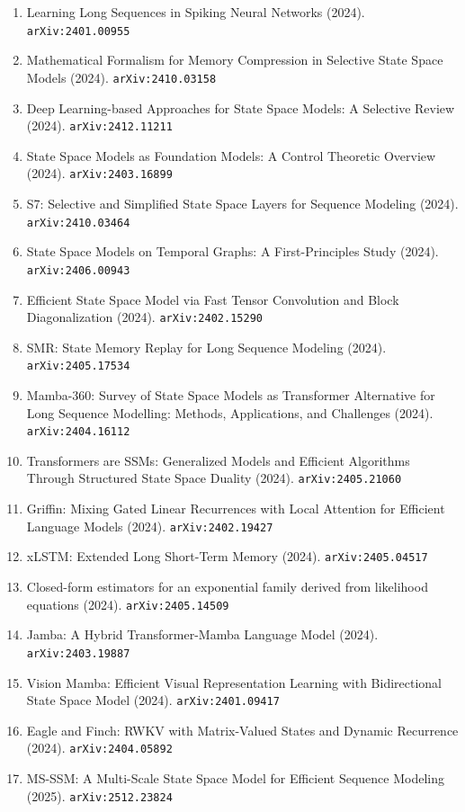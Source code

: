 \documentclass[11pt]{article}
\begin{document}
\begin{enumerate}
  \item Learning Long Sequences in Spiking Neural Networks (2024). \texttt{arXiv:2401.00955}
  \item Mathematical Formalism for Memory Compression in Selective State Space
  Models (2024). \texttt{arXiv:2410.03158}
  \item Deep Learning-based Approaches for State Space Models: A Selective
  Review (2024). \texttt{arXiv:2412.11211}
  \item State Space Models as Foundation Models: A Control Theoretic Overview (2024). \texttt{arXiv:2403.16899}
  \item S7: Selective and Simplified State Space Layers for Sequence Modeling (2024). \texttt{arXiv:2410.03464}
  \item State Space Models on Temporal Graphs: A First-Principles Study (2024). \texttt{arXiv:2406.00943}
  \item Efficient State Space Model via Fast Tensor Convolution and Block
  Diagonalization (2024). \texttt{arXiv:2402.15290}
  \item SMR: State Memory Replay for Long Sequence Modeling (2024). \texttt{arXiv:2405.17534}
  \item Mamba-360: Survey of State Space Models as Transformer Alternative for
  Long Sequence Modelling: Methods, Applications, and Challenges (2024). \texttt{arXiv:2404.16112}
  \item Transformers are SSMs: Generalized Models and Efficient Algorithms
  Through Structured State Space Duality (2024). \texttt{arXiv:2405.21060}
  \item Griffin: Mixing Gated Linear Recurrences with Local Attention for
  Efficient Language Models (2024). \texttt{arXiv:2402.19427}
  \item xLSTM: Extended Long Short-Term Memory (2024). \texttt{arXiv:2405.04517}
  \item Closed-form estimators for an exponential family derived from likelihood
  equations (2024). \texttt{arXiv:2405.14509}
  \item Jamba: A Hybrid Transformer-Mamba Language Model (2024). \texttt{arXiv:2403.19887}
  \item Vision Mamba: Efficient Visual Representation Learning with
  Bidirectional State Space Model (2024). \texttt{arXiv:2401.09417}
  \item Eagle and Finch: RWKV with Matrix-Valued States and Dynamic Recurrence (2024). \texttt{arXiv:2404.05892}
  \item MS-SSM: A Multi-Scale State Space Model for Efficient Sequence Modeling (2025). \texttt{arXiv:2512.23824}

\end{enumerate}
\end{document}
